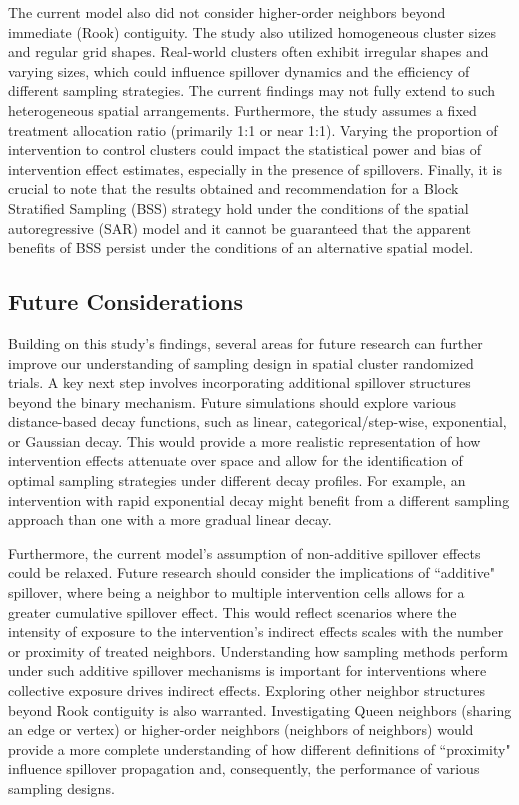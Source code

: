\documentclass{article}[11pt]
\begin{document}
The current model also did not consider higher-order neighbors beyond immediate (Rook) contiguity. The study also utilized homogeneous cluster sizes and regular grid shapes. Real-world clusters often exhibit irregular shapes and varying sizes, which could influence spillover dynamics and the efficiency of different sampling strategies. The current findings may not fully extend to such heterogeneous spatial arrangements. Furthermore, the study assumes a fixed treatment allocation ratio (primarily 1:1 or near 1:1). Varying the proportion of intervention to control clusters could impact the statistical power and bias of intervention effect estimates, especially in the presence of spillovers. Finally, it is crucial to note that the results obtained and recommendation for a Block Stratified Sampling (BSS) strategy hold under the conditions of the spatial autoregressive (SAR) model and it cannot be guaranteed that the apparent benefits of BSS persist under the conditions of an alternative spatial model.

\subsection{Future Considerations}

Building on this study's findings, several areas for future research can further improve our
understanding of sampling design in spatial cluster randomized trials. A key next step involves incorporating additional spillover structures beyond the binary mechanism. Future simulations should explore various distance-based decay functions, such
as linear, categorical/step-wise, exponential, or Gaussian decay. This would provide a more
realistic representation of how intervention effects attenuate over space and allow for the
identification of optimal sampling strategies under different decay profiles. For example, an
intervention with rapid exponential decay might benefit from a different sampling approach
than one with a more gradual linear decay.

Furthermore, the current model's assumption of non-additive spillover effects could be
relaxed. Future research should consider the implications of ``additive" spillover, where
being a neighbor to multiple intervention cells allows for a greater cumulative spillover effect.
This would reflect scenarios where the intensity of exposure to the intervention's indirect
effects scales with the number or proximity of treated neighbors. Understanding how
sampling methods perform under such additive spillover mechanisms is important for
interventions where collective exposure drives indirect effects. Exploring other neighbor structures beyond Rook contiguity is also warranted. Investigating Queen neighbors (sharing an edge or vertex) or higher-order neighbors (neighbors of
neighbors) would provide a more complete understanding of how different definitions of
``proximity" influence spillover propagation and, consequently, the performance of various
sampling designs.
\end{document}
